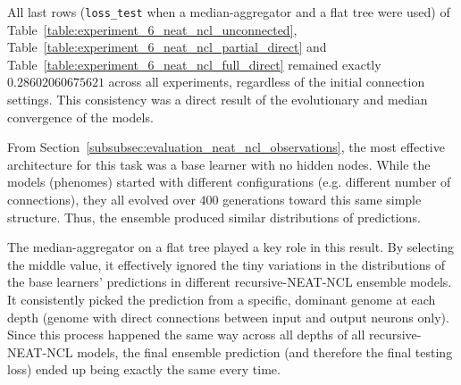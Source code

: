 All last rows (\texttt{loss\_test} when a median-aggregator and a flat tree were used) of Table~\ref{table:experiment_6_neat_ncl_unconnected}, Table~\ref{table:experiment_6_neat_ncl_partial_direct} and Table~\ref{table:experiment_6_neat_ncl_full_direct} remained exactly $0.28602060675621$ across all experiments, regardless of the initial connection settings. This consistency was a direct result of the evolutionary and median convergence of the models. 

From Section~\ref{subsubsec:evaluation_neat_ncl_observations}, the most effective architecture for this task was a base learner with no hidden nodes. While the models (phenomes) started with different configurations (e.g. different number of connections), they all evolved over 400 generations toward this same simple structure. Thus, the ensemble produced similar distributions of predictions. 

The median-aggregator on a flat tree played a key role in this result. By selecting the middle value, it effectively ignored the tiny variations in the distributions of the base learners' predictions in different recursive-NEAT-NCL ensemble models. It consistently picked the prediction from a specific, dominant genome at each depth (genome with direct connections between input and output neurons only). Since this process happened the same way across all depths of all recursive-NEAT-NCL models, the final ensemble prediction (and therefore the final testing loss) ended up being exactly the same every time. 




